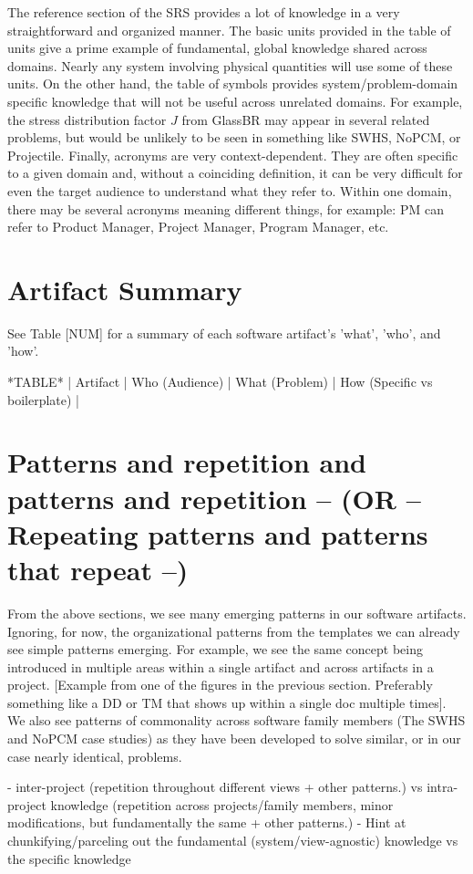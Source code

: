 The reference section of the SRS provides a lot of knowledge in a very 
straightforward and organized manner. The basic units provided in the table of 
units give a prime example of fundamental, global knowledge shared across 
domains. Nearly any system involving physical quantities will use some of these 
units. On the other hand, the table of symbols provides system/problem-domain 
specific knowledge that will not be useful across unrelated domains. For 
example, the stress distribution factor $J$ from GlassBR may appear in several 
related problems, but would be unlikely to be seen in something like SWHS, 
NoPCM, or Projectile. Finally, acronyms are very context-dependent. They are 
often specific to a given domain and, without a coinciding definition, it can 
be very difficult for even the target audience to understand what they refer 
to. Within one domain, there may be several acronyms meaning different things, 
for example: PM can refer to Product Manager, Project Manager, Program 
Manager, etc.


\section{Artifact Summary}

See Table [NUM] for a summary of each software artifact's 'what', 'who', and
'how'.

*TABLE*
| Artifact | Who (Audience) | What (Problem) | How (Specific vs boilerplate) |

\section{Patterns and repetition and patterns and repetition -- (OR -- Repeating patterns and patterns that repeat --)}
From the above sections, we see many emerging patterns in our software
artifacts. Ignoring, for now, the organizational patterns from the \smithea{}
templates we can already see simple patterns emerging. For example, we see the
same concept being introduced in multiple areas within a single artifact and
across artifacts in a project. [Example from one of the figures in the previous
section. Preferably something like a DD or TM that shows up within a single doc
multiple times]. We also see patterns of commonality across software family
members (The SWHS and NoPCM case studies) as they have been developed to solve
similar, or in our case nearly identical, problems.

- inter-project (repetition throughout different views + other patterns.)
  vs intra-project knowledge (repetition across projects/family members,
  minor modifications, but fundamentally the same + other patterns.)
- Hint at chunkifying/parceling out the fundamental (system/view-agnostic)
knowledge vs the specific knowledge

